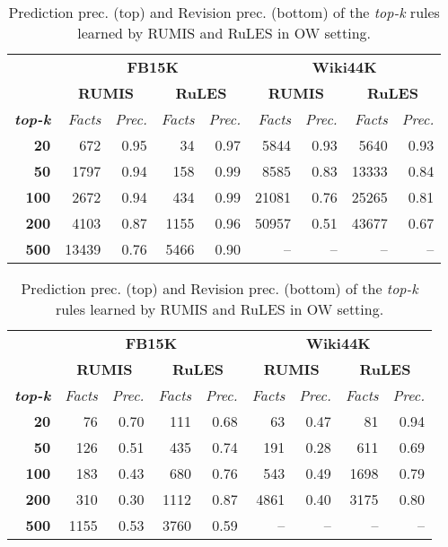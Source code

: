 \begin{table}[t]
\scriptsize
\centering
\begin{tabular}{r|r r|r r|r r|r r}
 & \multicolumn{4}{c}{\textbf{FB15K}} & \multicolumn{4}{|c}{\textbf{Wiki44K}} \\
 \cmidrule{2-9}&\multicolumn{2}{c}{\textbf{RUMIS}}&\multicolumn{2}{|c}{\textbf{RuLES}}&\multicolumn{2}{c}{\textbf{RUMIS}}&\multicolumn{2}{|c}{\textbf{RuLES}} \\
\textbf{\textit{top-k}} & \emph{Facts} & \emph{Prec.} & \emph{Facts} & \emph{Prec.} & \emph{Facts} & \emph{Prec.}& \emph{Facts} & \emph{Prec.} \\
 \midrule
\textbf{20} & 672 & 0.95 & 34 & 0.97 & 5844 & 0.93 & 5640 & 0.93 \\
\textbf{50} & 1797 & 0.94 & 158 & 0.99 & 8585 & 0.83 & 13333 & 0.84 \\
\textbf{100} & 2672 & 0.94 & 434 & 0.99 & 21081 & 0.76 & 25265 & 0.81 \\
\textbf{200} & 4103 & 0.87 & 1155 & 0.96 & 50957 & 0.51 & 43677 & 0.67 \\
\textbf{500} & 13439 & 0.76 & 5466 & 0.90 & -- & -- & -- & -- \\
\bottomrule
\end{tabular}
\begin{tabular}{r | r r| r r | r r |r r}
 & \multicolumn{4}{c}{\textbf{FB15K}} & \multicolumn{4}{|c}{\textbf{Wiki44K}} \\
 \cmidrule{2-9}&\multicolumn{2}{c}{\textbf{RUMIS}}&\multicolumn{2}{|c}{\textbf{RuLES}}&\multicolumn{2}{|c}{\textbf{RUMIS}}&\multicolumn{2}{|c}{\textbf{RuLES}} \\
\textbf{\textit{top-k}} & \emph{Facts} & \emph{Prec.} & \emph{Facts} & \emph{Prec.} & \emph{Facts} & \emph{Prec.}& \emph{Facts} & \emph{Prec.} \\
 \midrule
\textbf{20} & 76 & 0.70 & 111 & 0.68 & 63 & 0.47 & 81 & 0.94 \\
\textbf{50} & 126 & 0.51 & 435 & 0.74 & 191 & 0.28 & 611 & 0.69 \\
\textbf{100} & 183 & 0.43 & 680 & 0.76 & 543 & 0.49 & 1698 & 0.79 \\
\textbf{200} & 310 & 0.30 & 1112 & 0.87 & 4861 & 0.40 & 3175 & 0.80 \\
\textbf{500} & 1155 & 0.53 & 3760 & 0.59 & -- & -- & -- & -- \\
\bottomrule
\end{tabular}

\caption*{Prediction prec. (top) and Revision prec. (bottom)
of the \textit{top-k} rules learned by RUMIS and RuLES in OW setting.}
\label{table:exception_prediction_result}
\vspace*{-3mm}
\end{table}